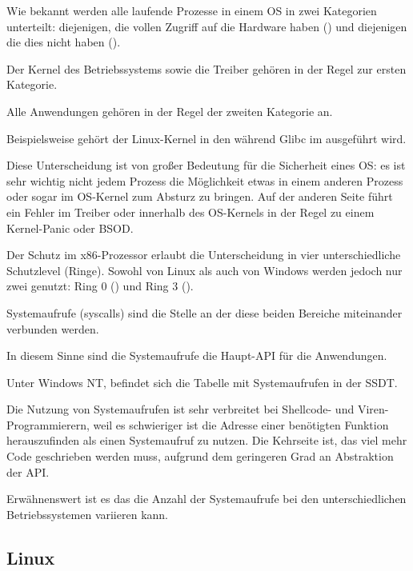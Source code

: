 
\label{syscalls}

Wie bekannt werden alle laufende Prozesse in einem \ac{OS} in zwei Kategorien unterteilt:
diejenigen, die vollen Zugriff auf die Hardware haben () und diejenigen
die dies nicht haben ().

Der Kernel des Betriebssystems sowie die Treiber gehören in der Regel zur ersten Kategorie.

Alle Anwendungen gehören in der Regel der zweiten Kategorie an.

Beispielsweise gehört der Linux-Kernel in den  während Glibc im 
ausgeführt wird.

Diese Unterscheidung ist von großer Bedeutung für die Sicherheit eines \ac{OS}:
es ist sehr wichtig nicht jedem Prozess die Möglichkeit etwas in einem anderen Prozess oder
sogar im \ac{OS}-Kernel zum Absturz zu bringen.
Auf der anderen Seite führt ein Fehler im Treiber oder innerhalb des \ac{OS}-Kernels in der Regel
zu einem Kernel-Panic oder \ac{BSOD}.

Der Schutz im x86-Prozessor erlaubt die Unterscheidung in vier unterschiedliche Schutzlevel (Ringe).
Sowohl von Linux als auch von Windows werden jedoch nur zwei genutzt:
Ring 0 () und Ring 3 ().

Systemaufrufe (syscalls) sind die Stelle an der diese beiden Bereiche miteinander verbunden werden.

In diesem Sinne sind die Systemaufrufe die Haupt-\ac{API} für die Anwendungen.

Unter \gls{Windows NT}, befindet sich die Tabelle mit Systemaufrufen in der \ac{SSDT}.


Die Nutzung von Systemaufrufen ist sehr verbreitet bei Shellcode- und Viren-Programmierern,
weil es schwieriger ist die Adresse einer benötigten Funktion herauszufinden als einen
Systemaufruf zu nutzen.
Die Kehrseite ist, das viel mehr Code geschrieben werden muss, aufgrund dem geringeren Grad
an Abstraktion der \ac{API}.

Erwähnenswert ist es das die Anzahl der Systemaufrufe bei den unterschiedlichen Betriebssystemen
variieren kann.

\subsection{Linux}
\label{linux_syscall}

